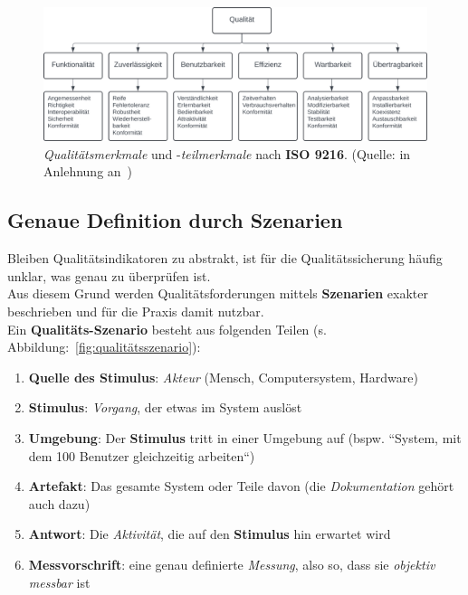 \begin{figure}
    \centering
    \includegraphics[scale=0.4]{part four/Qualität/img/qualitätsmerkmale}
    \caption{\textit{Qualitätsmerkmale} und -\textit{teilmerkmale} nach \textbf{ISO 9216}. (Quelle: in Anlehnung an~\cite[Abb. 1.2, 3]{Wed09c})}
    \label{fig:qualitätsmerkmale}
\end{figure}


\subsection*{Genaue Definition durch Szenarien}
Bleiben Qualitätsindikatoren zu abstrakt, ist für die Qualitätssicherung häufig unklar, was genau zu überprüfen ist.\\
Aus diesem Grund werden Qualitätsforderungen mittels \textbf{Szenarien} exakter beschrieben und für die Praxis damit nutzbar.\\
Ein \textbf{Qualitäts-Szenario} besteht aus folgenden Teilen (s. Abbildung:~\ref{fig:qualitätsszenario}):

\begin{enumerate}
    \item \textbf{Quelle des Stimulus}: \textit{Akteur} (Mensch, Computersystem, Hardware)
    \item \textbf{Stimulus}: \textit{Vorgang}, der etwas im System auslöst
    \item \textbf{Umgebung}: Der \textbf{Stimulus} tritt in einer Umgebung auf (bspw. ``System, mit dem 100 Benutzer gleichzeitig arbeiten``)
    \item \textbf{Artefakt}: Das gesamte System oder Teile davon (die \textit{Dokumentation} gehört auch dazu)
    \item \textbf{Antwort}: Die \textit{Aktivität}, die auf den \textbf{Stimulus} hin erwartet wird
    \item \textbf{Messvorschrift}: eine genau definierte \textit{Messung}, also so, dass sie \textit{objektiv messbar} ist
\end{enumerate}


